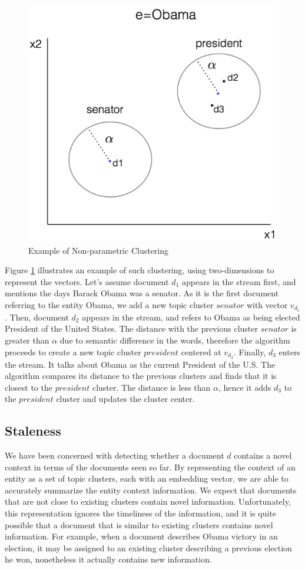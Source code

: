 \documentclass{article}
\begin{document}
\begin{figure}[tb]
\centering
\includegraphics[width=0.7\columnwidth]{fig/obamaExample.png}
\caption{Example of Non-parametric Clustering}
\label{obama}
\end{figure}

Figure \ref{obama} illustrates an example of such clustering, using two-dimensions to represent the vectors.
Let's assume document $d_1$ appears in the stream first, and mentions the days Barack Obama was a senator. As it is the first document referring to the entity Obama, we add a new topic cluster $senator$ with vector $v_{d_1}$. 
Then, document $d_2$ appears in the stream, and refers to Obama as being elected President of the United States.
The distance with the previous cluster $senator$ is greater than $\alpha$ due to semantic difference in the words, therefore the algorithm proceeds to create a new topic cluster $president$ centered at $v_{d_2}$. 
Finally, $d_3$ enters the stream. 
It talks about Obama as the current President of the U.S. 
The algorithm compares its distance to the previous clusters and finds that it is closest to the $president$ cluster. 
The distance is less than $\alpha$, hence it adds $d_3$ to the $president$ cluster and updates the cluster center. 

\subsection{Staleness}
\label{staleness}

We have been concerned with detecting whether a document $d$ contains a novel context in terms of the documents seen so far.
By representing the context of an entity as a set of topic clusters, each with an embedding vector, we are able to accurately summarize the entity context information. We expect that documents that are not close to existing clusters contain novel information.
Unfortunately, this representation ignores the timeliness of the information, and it is quite possible that a document that is similar to existing clusters contains novel information.
For example, when a document describes Obama victory in an election, it may be assigned to an existing cluster describing a previous election he won, nonetheless it actually contains new information.
\end{document}
